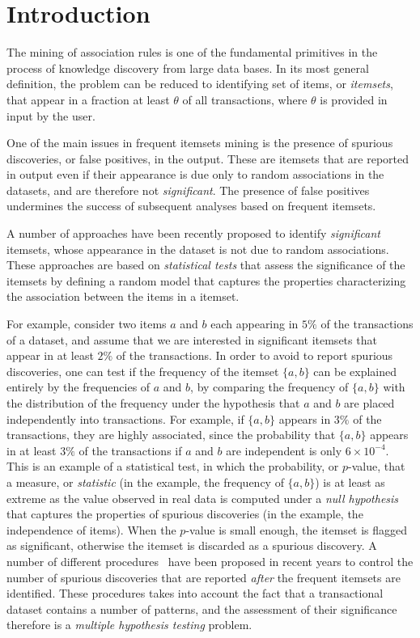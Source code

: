 \section{Introduction}\label{sec:realfisintro}

The mining of association rules is one of the fundamental primitives in the process
 of knowledge discovery from large data bases. In its most general definition, the problem
 can be reduced to identifying set of items, or \emph{itemsets},
that appear in a fraction at least $\theta$ of all
 transactions, where $\theta$ is provided in input by the user.

One of the main issues in frequent itemsets mining is the presence of spurious
discoveries, or false positives, in the output. These are itemsets that are
reported in output even if their appearance is due only to random associations
in the datasets, and are therefore not \emph{significant}. The presence of false
positives undermines the success of subsequent analyses based on frequent
itemsets.

A number of approaches have been recently proposed to identify
\emph{significant} itemsets, whose appearance in the dataset is not due to
random associations.  These approaches are based on \emph{statistical tests}
that assess the significance of the itemsets by defining a random model that
captures the properties characterizing the association between the items in a
itemset.

For example, consider two items $a$ and $b$ each appearing in $5\%$ of the %
transactions of a dataset, and assume that we are interested in significant
itemsets that appear in at least $2\%$ of the transactions. In order to avoid to
report spurious discoveries, one can test if the frequency of the itemset $\{a,b\}$ can be
explained entirely by the frequencies of $a$ and $b$, by comparing the
frequency of $\{a,b\}$ with the distribution of the frequency under the
hypothesis that $a$ and $b$ are placed independently into transactions.  For
example, if $\{a,b\}$ appears in $3\%$ of the transactions, they are highly
associated, since the probability that $\{a,b\}$ appears in at least $3\%$ of
the transactions if $a$ and $b$ are independent is only $6\times 10^{-4}$. This
is an example of a statistical test, in which the probability, or $p$-value,
that a measure, or \emph{statistic} (in the example, the frequency of $\{a,b\}$)
is at least as extreme as the value observed in real data is computed under a
\emph{null hypothesis} that captures the properties of spurious discoveries (in
the example, the independence of items). When the $p$-value is small enough, the
itemset is flagged as significant, otherwise the itemset is discarded as a
spurious discovery. A number of different procedures~\citep{SilversteinBM98,MegiddoS98,DuMouchelP01,BoltonHA02,GionisMMT07,Hamalainen10,KirschMAPUV12} have been proposed
in recent years to control the number of spurious discoveries that are reported
\emph{after} the frequent itemsets are identified. These procedures takes into
account the fact that a transactional dataset contains a number of patterns, and
the assessment of their significance therefore is a \emph{multiple
hypothesis testing} problem.

